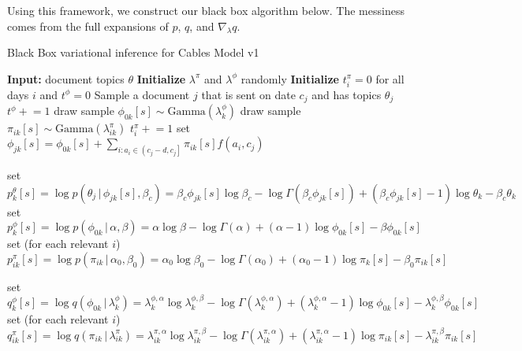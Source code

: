 \documentclass{article}
\newcommand{\pluseq}{\mathrel{+}=}
\newcommand{\g}{\, | \,}
\begin{document}
Using this framework, we construct our black box algorithm below.  The messiness comes from the full expansions of $p$, $q$, and $\nabla_\lambda q$.


\begin{algorithm}[h]
\small
\caption{Black Box variational inference for Cables Model v1}
\label{alg:SPF}
\begin{algorithmic}[1]
\State \textbf{Input:} document topics $\theta$
\State \textbf{Initialize} $\lambda^\pi$ and $\lambda^\phi$ randomly
\State \textbf{Initialize} $t^\pi_i = 0$ for all days $i$ and $t^\phi = 0$
\Repeat
	\State Sample a document $j$ that is sent on date $c_j$ and has topics $\theta_j$
	\State $t^\phi \pluseq 1$
			\State draw sample $\phi_{0k}[s] \sim \mbox{Gamma}(\lambda^\phi_{k})$ 
			\For {each event $i$ on date $a_i \in \left( c_j - d, c_j \right]$}
				\State draw sample $\pi_{ik}[s] \sim \mbox{Gamma}(\lambda^\pi_{ik})$
				\State $t^\pi_i \pluseq 1$
			\EndFor
			\State set $\phi_{jk}[s] = \phi_{0k}[s] + \sum_{i : a_i \in \left( c_j - d, c_j \right]} \pi_{ik}[s] f(a_i, c_j)$
			
			\State set $p^\theta_k[s] = \log p(\theta_j \g \phi_{jk}[s], \beta_c) = \beta_c \phi_{jk}[s] \log \beta_c - \log\Gamma(\beta_c \phi_{jk}[s]) + (\beta_c \phi_{jk}[s] - 1) \log \theta_k - \beta_c \theta_k$
			\State set $p^\phi_k[s] = \log p(\phi_{0k} \g \alpha, \beta) = \alpha \log \beta - \log\Gamma(\alpha) + (\alpha - 1) \log \phi_{0k}[s] - \beta \phi_{0k}[s]$
			\State set (for each relevant $i$) $p^\pi_{ik}[s] = \log p(\pi_{ik} \g \alpha_0, \beta_0) = \alpha_0 \log \beta_0 - \log\Gamma(\alpha_0) + (\alpha_0 - 1) \log \pi_{k}[s] - \beta_0 \pi_{ik}[s]$
			
			\State set $q^\phi_k[s] = \log q(\phi_{0k} \g \lambda^\phi_k) = \lambda^{\phi,\alpha}_k \log  \lambda^{\phi,\beta}_k - \log\Gamma( \lambda^{\phi,\alpha}_k) + ( \lambda^{\phi,\alpha}_k - 1) \log \phi_{0k}[s] -  \lambda^{\phi,\beta}_k \phi_{0k}[s]$
			\State set (for each relevant $i$) $q^\pi_{ik}[s] = \log q(\pi_{ik} \g \lambda^\pi_{ik}) = \lambda^{\pi,\alpha}_{ik} \log \lambda^{\pi,\beta}_{ik} - \log\Gamma(\lambda^{\pi,\alpha}_{ik}) + (\lambda^{\pi,\alpha}_{ik} - 1) \log \pi_{ik}[s] - \lambda^{\pi,\beta}_{ik} \pi_{ik}[s]$
			

\end{algorithmic}
\end{algorithm}
\end{document}
